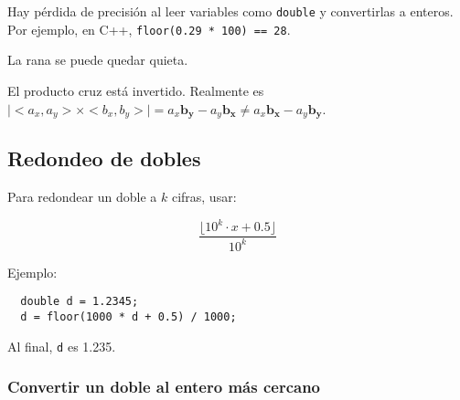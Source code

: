 \documentclass[10pt,letterpaper,twocolumn]{article}
\begin{document}
\begin{itemize}
  \begin{item}
    Hay pérdida de precisión al leer variables como \verb_double_ y convertirlas a enteros. Por ejemplo, en C++, \verb_floor(0.29 * 100) == 28_.
  \end{item}

  \begin{item}
    La rana se puede quedar quieta.
  \end{item}
  
  \begin{item}
    El producto cruz está invertido. Realmente es $\mid<a_x, a_y> \times <b_x, b_y>\mid = a_x \mathbf{b_y} - a_y \mathbf{b_x} \neq a_x \mathbf{b_x} - a_y \mathbf{b_y} $.
  \end{item}
\end{itemize}

\subsection{Redondeo de dobles}

Para redondear un doble a $k$ cifras, usar:

$$ \frac{\lfloor 10^{k} \cdot x + 0.5 \rfloor }{10^k} $$

Ejemplo:

\begin{verbatim}
  double d = 1.2345;
  d = floor(1000 * d + 0.5) / 1000;
\end{verbatim}

Al final, \verb_d_ es 1.235.

\subsubsection{Convertir un doble al entero más cercano}
\end{document}

